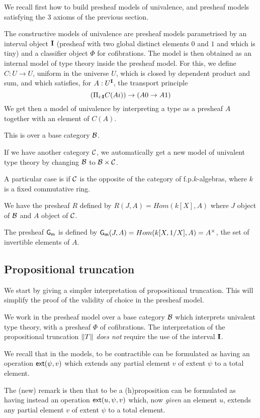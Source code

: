     We recall first how to build presheaf models of univalence, and presheaf models satisfying the 3 axioms of the previous section.

The constructive models of univalence are presheaf models parametrised by an interval object $\mathbf{I}$
(presheaf with two global distinct elements $0$ and $1$ and which is tiny) and a classifier object
$\Phi$ for cofibrations. The model is then obtained as an internal model of type theory inside the
presheaf model. For this, we define $C:U\rightarrow U$, uniform in the universe $U$,
which is closed by dependent product and sum, and which satisfies, for $A:U^{\mathbf{I}}$, the transport principle
$$
(\Pi_{i:\mathbf{I}}C(Ai))\rightarrow (A0\rightarrow A1)
$$
We get then a model of univalence by interpreting a type as a presheaf $A$ together with an element
of $C(A)$.


 This is over a base category $\mathcal{B}$.
 
 If we have another category $\mathcal{C}$, we automatically get a new model of univalent type theory by
 changing $\mathcal{B}$ to $\mathcal{B}\times\mathcal{C}$.

 A particular case is if $\mathcal{C}$ is the opposite of the category of f.p.\@ $k$-algebras, where $k$ is a
 fixed commutative ring.

 We have the presheaf $R$ defined by $R(J,A) = Hom(k[X],A)$ where $J$ object of $\mathcal{B}$ and $A$ object of $\mathcal{C}$.

  The presheaf $\mathsf{G_m}$ is defined by $\mathsf{G_m}(J,A) = Hom(k[X,1/X],A) = A^{\times}$, the set of invertible elements of $A$.

\subsection{Propositional truncation}

    We start by giving a simpler interpretation of propositional truncation. This will simplify
    the proof of the validity of choice in the presheaf model.

    We work in the presheaf model over a base category $\mathcal{B}$ which interprets univalent type theory,
    with a presheaf $\Phi$ of cofibrations. The interpretation of the propositional
    truncation $\left\lVert T \right\rVert$ {\em does not} require the use of the interval $\mathbf{I}$.

    We recall that in the models, to be contractible can be formulated as having an operation
    $\mathsf{ext}(\psi,v)$ which extends any partial element $v$ of extent $\psi$ to a total element.

    The (new) remark is then that to be a (h)proposition can be formulated as having instead
    an operation $\mathsf{ext}(u,\psi,v)$ which, now {\em given}
    an element $u$, extends any partial element $v$ of extent $\psi$ to a total element.


